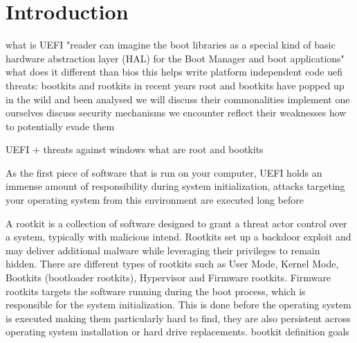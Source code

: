

\chapter{Introduction}


what is UEFI
"reader can imagine the boot libraries as a special kind of basic hardware abstraction layer (HAL) for the
Boot Manager and boot applications" \cite{windows-internals-7-part2}
what does it different than bios
this helps write platform independent code
uefi threats:
bootkits and rootkits
in recent years root and bootkits have popped up in the wild and been analysed
we will discuss their commonalities
implement one ourselves
discuss security mechanisms we encounter
reflect their weaknesses
how to potentially evade them

UEFI + threats against windows
what are root and bootkits

As the first piece of software that is run on your computer, UEFI holds an immense amount of responsibility during system initialization, attacks targeting your operating system from this environment are executed long before


A rootkit is a collection of software designed to grant a threat actor control over a system, typically with malicious intend.
Rootkits set up a backdoor exploit and may deliver additional malware while leveraging their privileges to remain hidden.
There are different types of rootkits such as User Mode, Kernel Mode, Bootkits (bootloader rootkits), Hypervisor and Firmware rootkits.
\cite{crowdstrike, techtarget}
Firmware rootkits targets the software running during the boot process, which is responsible for the system initialization. This is done before the operating system is executed making them particularly hard to find, they are also persistent across operating system installation or hard drive replacements.
\cite{crowdstrike}
bootkit definition
goals


